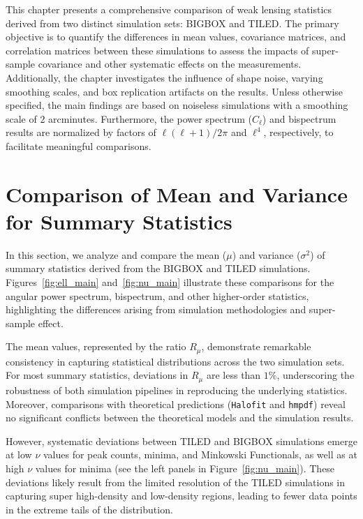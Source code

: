 This chapter presents a comprehensive comparison of weak lensing statistics derived from two distinct simulation sets: BIGBOX and TILED. The primary objective is to quantify the differences in mean values, covariance matrices, and correlation matrices between these simulations to assess the impacts of super-sample covariance and other systematic effects on the measurements. Additionally, the chapter investigates the influence of shape noise, varying smoothing scales, and box replication artifacts on the results. Unless otherwise specified, the main findings are based on noiseless simulations with a smoothing scale of 2 arcminutes. Furthermore, the power spectrum ($C_\ell$) and bispectrum results are normalized by factors of $\ell(\ell+1)/2\pi$ and $\ell^4$, respectively, to facilitate meaningful comparisons.

\section{Comparison of Mean and Variance for Summary Statistics}
In this section, we analyze and compare the mean ($\mu$) and variance ($\sigma^2$) of summary statistics derived from the BIGBOX and TILED simulations. Figures~\ref{fig:ell_main} and~\ref{fig:nu_main} illustrate these comparisons for the angular power spectrum, bispectrum, and other higher-order statistics, highlighting the differences arising from simulation methodologies and super-sample effect.

The mean values, represented by the ratio $R_{\mu}$, demonstrate remarkable consistency in capturing statistical distributions across the two simulation sets. For most summary statistics, deviations in $R_{\mu}$ are less than $1\%$, underscoring the robustness of both simulation pipelines in reproducing the underlying statistics. Moreover, comparisons with theoretical predictions (\texttt{Halofit} and \texttt{hmpdf}) reveal no significant conflicts between the theoretical models and the simulation results.

However, systematic deviations between TILED and BIGBOX simulations emerge at low $\nu$ values for peak counts, minima, and Minkowski Functionals, as well as at high $\nu$ values for minima (see the left panels in Figure~\ref{fig:nu_main}). These deviations likely result from the limited resolution of the TILED simulations in capturing super high-density and low-density regions, leading to fewer data points in the extreme tails of the distribution.

